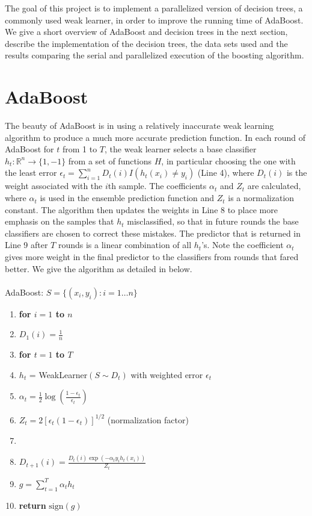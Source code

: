 \documentclass[12pt]{article}
\begin{document}
The goal of this project is to implement a parallelized version of decision trees, a commonly
used weak learner, in order to improve the running time of AdaBoost. We
give a short overview of AdaBoost and decision trees in the next section,
describe the implementation of the decision trees, the data sets used and the
results comparing the serial and parallelized execution of the boosting algorithm. 

\section{AdaBoost}

\indent The beauty of AdaBoost is in using a relatively inaccurate
weak learning algorithm to produce a much more accurate prediction function. In
each round of AdaBoost for $t$ from 1 to $T$, the weak learner selects a
base classifier $h_t: \mathbb{R}^n\rightarrow\{1,-1\}$ from a set of functions
$H$, in particular choosing the one with the least error
$\epsilon_t=\sum_{i=1}^{n}D_t(i)I(h_t(x_i)\neq y_i)$ (Line 4), where $D_t(i)$ is
the weight associated with the $i$th sample. The coefficients $\alpha_t$ and $Z_t$ are calculated, where $\alpha_t$ is used in the ensemble prediction function and $Z_t$ is a normalization constant. The algorithm then updates the
weights in Line 8 to place more emphasis on the samples that $h_t$ misclassified,
so that in future rounds the base classifiers are chosen to correct these mistakes. The predictor that is
returned in Line 9 after $T$ rounds is a linear combination of all $h_t$'s. Note the
coefficient $\alpha_t$ gives more weight in the final predictor to the classifiers from rounds that fared better.
We give the algorithm as detailed in \cite{Mohri} below.\\ \\
{\sc AdaBoost}: $S = \{(x_i,y_i):i = 1\ldots n\}$
\begin{enumerate}
\itemsep1pt \parskip0pt 
\item {\bf for $i=1$ to $n$}
\item \quad $D_1(i) = \frac{1}{n}$
\item {\bf for $t=1$ to $T$}
\item \quad $h_t$ = {\sc WeakLearner}$(S\sim D_t)$ with weighted error $\epsilon_t$
\item \quad $\alpha_t = \frac{1}{2}\log(\frac{1-\epsilon_t}{\epsilon_t})$
\item \quad $Z_t = 2[\epsilon_t(1-\epsilon_t)]^{1/2}$ (normalization factor)
\item {}
\item \quad \quad $D_{t+1}(i) = \frac{D_t(i)\exp(-\alpha_t y_i h_t(x_i))}{Z_t}$
\item $g = \sum_{t=1}^T \alpha_t h_t$
\item {\bf return} $\mbox{sign}(g)$
\end{enumerate}
\end{document}
